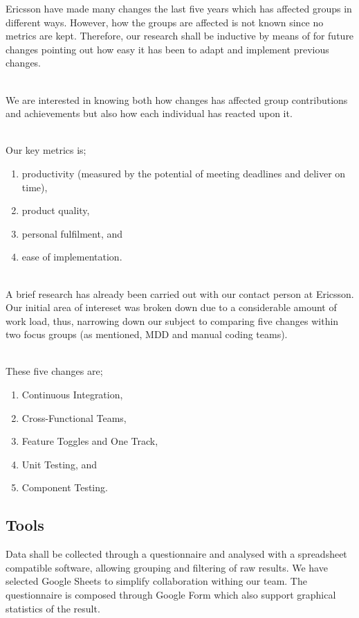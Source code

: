 \documentclass[ProjectPlan_innit.tex]{subfiles}
\begin{document}
Ericsson have made many changes the last five years which has affected groups in different ways. However, how the groups are affected is not known since no metrics are kept. Therefore, our research shall be inductive by means of for future changes pointing out how easy it has been to adapt and implement previous changes.

\hspace{0pt}\\
We are interested in knowing both how changes has affected group contributions and achievements but also how each individual has reacted upon it.

\hspace{0pt}\\ 
Our key metrics is;
\begin{enumerate}
	\item productivity (measured by the potential of meeting deadlines and deliver on time),
	\item product quality,
	\item personal fulfilment, and
	\item ease of implementation.
\end{enumerate}

\hspace{0pt}\\ 
A brief research has already been carried out with our contact person at Ericsson. Our initial area of intereset was broken down due to a considerable amount of work load, thus, narrowing down our subject to comparing five changes within two focus groups (as mentioned, MDD and manual coding teams).

\hspace{0pt}\\ 
These five changes are;
\begin{enumerate}
	\item Continuous Integration,
	\item Cross-Functional Teams,
	\item Feature Toggles and One Track,
	\item Unit Testing, and
	\item Component Testing.
\end{enumerate}

\subsection{Tools}
Data shall be collected through a questionnaire and analysed with a spreadsheet compatible software, allowing grouping and filtering of raw results. We have selected Google Sheets to simplify collaboration withing our team. The questionnaire is composed through Google Form which also support graphical statistics of the result.
\end{document}

